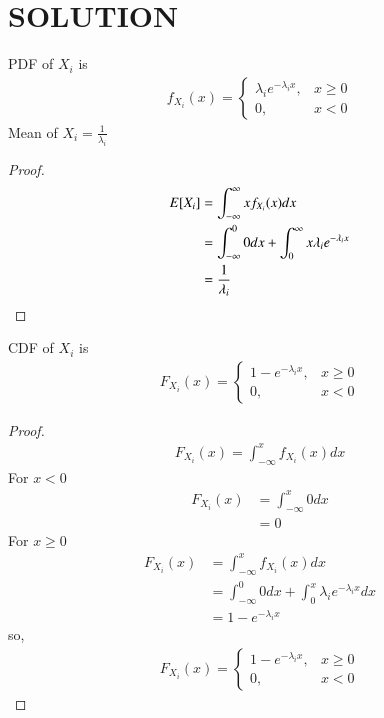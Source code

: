 \documentclass[journal,12pt,twocolumn]{IEEEtran}
\begin{document}
\section{SOLUTION}
\begin{lemma}
PDF of $X_i$ is
\begin{align}
    f_{X_i}(x)=\begin{cases}\lambda_i e^{-\lambda_i x}, &x\geq 0\\
                0, &x<0\nonumber
    \end{cases}    
\end{align}
Mean of $X_i=\frac{1}{\lambda_i}$\\

\end{lemma}
\begin{proof}
\begin{align}
    E[ X_i ]&=\int_{-\infty}^{\infty}x f_{X_i}(x) dx\\
              &=\int_{-\infty}^{0}0 dx + \int_{0}^{\infty}x \lambda_i e^{-\lambda_i x}\\
              &=\frac{1}{\lambda_i}\label{mean}
\end{align}
\end{proof}
\begin{lemma}
  CDF of  $X_i$ is
\begin{align}
    F_{X_i}(x)=\begin{cases}1-e^{-\lambda_i x}, &x\geq 0\\
                0, &x<0\nonumber
    \end{cases}    
\end{align}
\end{lemma}
\begin{proof}
\begin{align}
   F_{X_i}(x)=\int_{-\infty}^{x}f_{X_i}(x)dx
\end{align}
For $x<0$
\begin{align}
    F_{X_i}(x)&=\int_{-\infty}^{x}0dx\\
    &=0
\end{align}
For $x\geq0$
\begin{align}
    F_{X_i}(x)&=\int_{-\infty}^{x}f_{X_i}(x)dx\\
    &=\int_{-\infty}^{0}0dx +\int_{0}^{x}\lambda_i e^{-\lambda_i x}dx\\
    &=1-e^{-\lambda_i x}
\end{align}
so,
\begin{align}
    F_{X_i}(x)=\begin{cases}1-e^{-\lambda_i x}, &x\geq 0\\
                0, &x<0\nonumber
    \end{cases}    
\end{align}
\end{proof}
\end{document}
